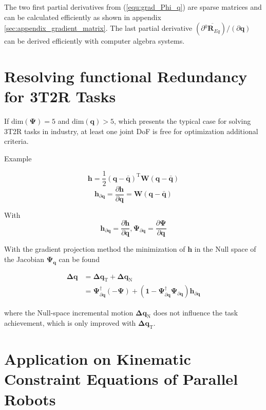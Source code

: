 \documentclass[twocolumn,10pt]{IFTOMM}
\newcommand{\bm}[1]{\boldsymbol{#1}}
\newcommand{\rotmat}[2]{{{ }^{#1}\boldsymbol{R}}_{#2}}
\newcommand{\transp}[0]{{\mathrm{T}}}
\begin{document}
The two first partial derivatives from (\ref{equ:grad_Phi_q}) are sparse matrices and can be calculated efficiently as shown in appendix \ref{sec:appendix_gradient_matrix}.
The last partial derivative $(\partial \overline{\rotmat{0}{Eq}}) / (\partial \bm{q})$ can be derived efficiently with computer algebra systems.

\section{Resolving functional Redundancy for 3T2R Tasks}
\label{sec:ResFuncRed}


If $\mathrm{dim}(\bm{\Psi})=5$ and $\mathrm{dim}(\bm{q})>5$, which presents the typical case for solving 3T2R tasks in industry, at least one joint DoF is free for optimization additional criteria.

Example

\begin{equation}
\bm{h}
=
\frac{1}{2} (\bm{q}-\bar{\bm{q}})^\transp\bm{W}(\bm{q}-\bar{\bm{q}})
\end{equation}  
%
\begin{equation}
\bm{h}_{\partial\bm{q}}
=
\frac{\partial \bm{h}}{\partial \bm{q}}
=
\bm{W}(\bm{q}-\bar{\bm{q}})
\end{equation}

With
\begin{equation}
\bm{h}_{\partial\bm{q}}=\frac{\partial \bm{h}}{\partial \bm{q}},
\bm{\Psi}_{\partial\bm{q}}=\frac{\partial \bm{\Psi}}{\partial \bm{q}}
\end{equation}


With the gradient projection method the minimization of $\bm{h}$ in the Null space of the Jacobian $\bm{\Psi}_{\bm{q}}$ can be found

\begin{align}
\bm{\Delta}\bm{q}
&=
\bm{\Delta}\bm{q}_{\mathrm{T}} + \bm{\Delta}\bm{q}_{\mathrm{N}} \\
&=
\bm{\Psi}_{\partial\bm{q}}^{\dagger} (-\bm{\Psi}) + (\bm{1}-\bm{\Psi}_{\partial\bm{q}}^{\dagger}\bm{\Psi}_{\partial\bm{q}}) \bm{h}_{\partial\bm{q}}
\end{align}

where the Null-space incremental motion $\bm{\Delta}\bm{q}_{\mathrm{N}}$ does not influence the task achievement, which is only improved with $\bm{\Delta}\bm{q}_{\mathrm{T}}$.

\section{Application on Kinematic Constraint Equations of Parallel Robots}
\label{sec:ParRobKinConstr}
\end{document}

